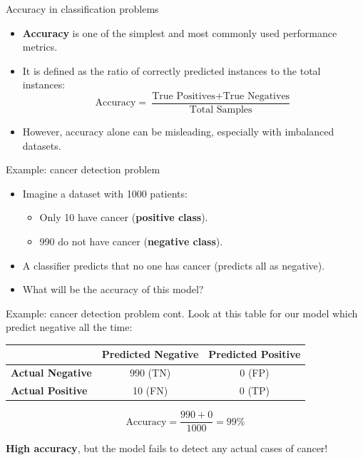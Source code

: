 \documentclass[serif, aspectratio=169]{beamer}
\begin{document}
\begin{frame}{Accuracy in classification problems}
    \begin{itemize}
        \item \textbf{Accuracy} is one of the simplest and most commonly used performance metrics.
        \item It is defined as the ratio of correctly predicted instances to the total instances:
        \[
        \text{Accuracy} = \frac{\text{True Positives} + \text{True Negatives}}{\text{Total Samples}}
        \]
        \item However, accuracy alone can be misleading, especially with imbalanced datasets.
    \end{itemize}
\end{frame}

\begin{frame}{Example: cancer detection problem}
    \begin{itemize}
        \item Imagine a dataset with 1000 patients:
        \begin{itemize}
            \item Only 10 have cancer (\textbf{positive class}).
            \item 990 do not have cancer (\textbf{negative class}).
        \end{itemize}
        \item A classifier predicts that no one has cancer (predicts all as negative).
        \item What will be the accuracy of this model?
    \end{itemize}
\end{frame}

\begin{frame}{Example: cancer detection problem cont.}
    Look at this table for our model which predict negative all the time:
    
    \begin{table}[h!]
        \centering
        \begin{tabular}{@{}lcc@{}}
            \toprule
            & \textbf{Predicted Negative} & \textbf{Predicted Positive} \\ \midrule
            \textbf{Actual Negative} & 990 (TN) & 0 (FP) \\
            \textbf{Actual Positive} & 10 (FN)  & 0 (TP) \\ \bottomrule
        \end{tabular}
    \end{table}
    
    \[
    \text{Accuracy} = \frac{990 + 0}{1000} = 99\%
    \]
    
    \textbf{High accuracy}, but the model fails to detect any actual cases of cancer!
\end{frame}
\end{document}

